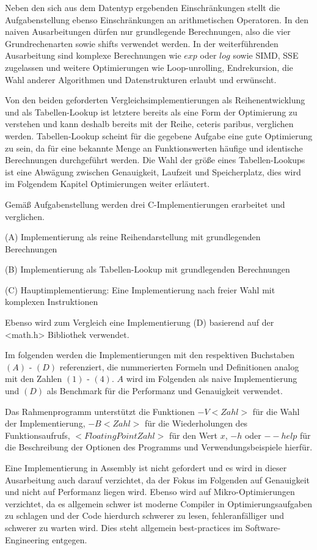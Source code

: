 \documentclass[course=erap] {aspdoc}
\begin{document}
    Neben den sich aus dem Datentyp ergebenden Einschränkungen stellt die Aufgabenstellung ebenso Einschränkungen an arithmetischen Operatoren.
    In den naiven Ausarbeitungen dürfen nur grundlegende Berechnungen, also die vier Grundrechenarten sowie shifts verwendet werden.
    In der weiterführenden Ausarbeitung sind komplexe Berechnungen wie $exp$ oder $log$ sowie SIMD, SSE zugelassen und weitere Optimierungen wie Loop-unrolling, Endrekursion, die Wahl anderer Algorithmen und Datenstrukturen erlaubt und erwünscht.


    Von den beiden geforderten Vergleichsimplementierungen als Reihenentwicklung und als Tabellen-Lookup ist letztere bereits als eine Form der Optimierung zu verstehen und kann deshalb bereits mit der Reihe, ceteris paribus, verglichen werden.
    Tabellen-Lookup scheint für die gegebene Aufgabe eine gute Optimierung zu sein, da für eine bekannte Menge an Funktionswerten häufige und identische Berechnungen durchgeführt werden.
    Die Wahl der größe eines Tabellen-Lookups ist eine Abwägung zwischen Genauigkeit, Laufzeit und Speicherplatz, dies wird im Folgendem Kapitel Optimierungen weiter erläutert.


    Gemäß Aufgabenstellung werden drei C-Implementierungen erarbeitet und verglichen.


    (A) Implementierung als reine Reihendarstellung mit grundlegenden Berechnungen


    (B) Implementierung als Tabellen-Lookup mit grundlegenden Berechnungen


    (C) Hauptimplementierung: Eine Implementierung nach freier Wahl mit komplexen Instruktionen

    Ebenso wird zum Vergleich eine Implementierung (D) basierend auf der <math.h> Bibliothek verwendet.

    Im folgenden werden die Implementierungen mit den respektiven Buchstaben $(A)$ - $(D)$ referenziert, die nummerierten Formeln und Definitionen analog mit den Zahlen $(1)$ - $(4)$.
    $A$ wird im Folgenden als naive Implementierung und $(D)$ als Benchmark für die Performanz und Genauigkeit verwendet.


    Das Rahmenprogramm unterstützt die Funktionen $-V<Zahl>$ für die Wahl der Implementierung, $-B<Zahl>$ für die Wiederholungen des Funktionsaufrufs, $<Floating Point Zahl>$ für den Wert $x$, $-h$ oder $--help$ für die Beschreibung der Optionen des Programms und Verwendungsbeispiele hierfür.


    Eine Implementierung in Assembly ist nicht gefordert und es wird in dieser Ausarbeitung auch darauf verzichtet, da der Fokus im Folgenden auf Genauigkeit und nicht auf Performanz liegen wird.
    Ebenso wird auf Mikro-Optimierungen verzichtet, da es allgemein schwer ist moderne Compiler in Optimierungsaufgaben zu schlagen und der Code hierdurch schwerer zu lesen, fehleranfälliger und schwerer zu warten wird.
    Dies steht allgemein best-practices im Software-Engineering entgegen.
\end{document}
